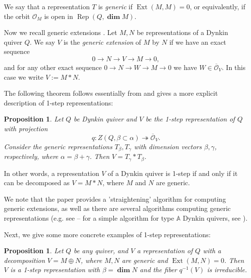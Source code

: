 \documentclass[twoside]{article}
\newcommand{\orb}{\mathcal{O}}
\DeclareMathOperator{\Dim}{\mathbf{dim}}
\newcommand{\Ext}{\operatorname{Ext}}
\newcommand{\Rep}{\operatorname{Rep}}
\newcommand{\A}{\mathbb{A}}
\newtheorem{proposition}[theorem]{Proposition}
\theoremstyle{definition}
\begin{document}
We say that a representation $T$ is \textit{generic} if $\Ext(M,M)=0$, or equivalently, if the orbit $\orb_{M}$ is open in $\Rep(Q,\Dim M)$.

Now we recall generic extensions \cite[Definition 2.2]{generic}. Let $M,N$ be representations of a Dynkin quiver $Q$. We say $V$ is the \textit{generic extension} of $M$ by $N$ if we have an exact sequence
$$0 \to N \to V \to M \to 0,$$
and for any other exact sequence $0 \to N \to W \to M \to 0$ we have $W\in \overline{\orb}_V$. In this case we write $V:=M*N$.

The following theorem follows essentially from \cite[Proposition 2.4]{generic} and gives a more explicit description of 1-step representations:

\begin{proposition}\label{prop:step1}
Let $Q$ be Dynkin quiver and $V$ be the 1-step representation of $Q$ with projection
$$q: Z(Q,\beta \subset \alpha) \twoheadrightarrow \overline{\orb}_V.$$
Consider the generic representations $T_{\beta},T_{\gamma}$ with dimension vectors $\beta,\gamma$, respectively, where $\alpha=\beta+\gamma$. Then $V=T_\gamma*T_\beta$.
\end{proposition}

In other words, a representation $V$ of a Dynkin quiver is 1-step if and only if it can be decomposed as $V=M*N$, where $M$ and $N$ are generic.

We note that the paper \cite{generic} provides a 'straightening' algorithm for computing generic extensions, as well as there are several algorithms computing generic representations (e.g. see \cite{canon} -- for a simple algorithm for type $\A$ Dynkin quivers, see \cite{abeasis}). 

Next, we give some more concrete examples of 1-step representations:

\begin{proposition}\label{prop:step2}
Let $Q$ be any quiver, and $V$ a representation of $Q$ with a decomposition $V=M\oplus N$, where $M,N$ are generic and $\Ext(M,N)=0$. Then $V$ is a 1-step representation with $\beta=\Dim N$ and the fiber $q^{-1}(V)$ is irreducible.
\end{proposition}
\end{document}
